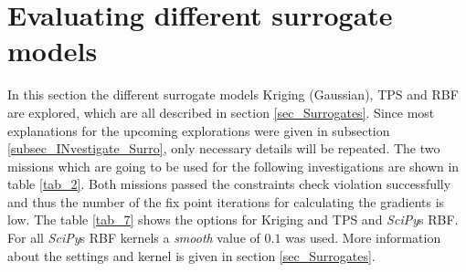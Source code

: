 \section{Evaluating different surrogate models}
\label{sec_Diff_Surrogates}
In this section the different surrogate models 
Kriging (Gaussian), TPS and RBF are 
explored, which are all described 
in section \ref{sec_Surrogates}. Since most 
explanations for the upcoming explorations 
were given in subsection \ref{subsec_INvestigate_Surro}, 
only necessary details will be repeated.
The two missions which are going 
to be used for the following investigations are 
shown in table \ref{tab_2}.
Both missions passed 
the constraints check 
violation successfully and thus 
the number of the fix point iterations 
for calculating the gradients is low.
The table \ref{tab_7} shows the 
options for Kriging and TPS and 
\emph{SciPy}s RBF. For all \emph{SciPy}s RBF 
kernels a \emph{smooth} value of 
$0.1$ \cite{noauthor_rbf_2021} was used.  More
information about the settings and kernel 
is given in section \ref{sec_Surrogates}. \newline 

